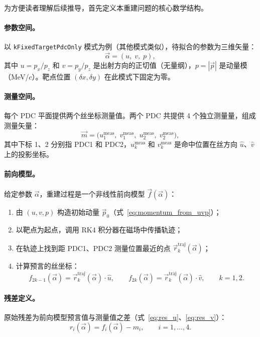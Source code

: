 \documentclass[a4paper, 11pt]{article}
\begin{document}
为方便读者理解后续推导，首先定义本重建问题的核心数学结构。

\paragraph{参数空间。}
以 \texttt{kFixedTargetPdcOnly} 模式为例（其他模式类似），待拟合的参数为三维矢量：
\begin{equation}
  \vec{\alpha} = (u,\; v,\; p),
  \label{eq:param_vec}
\end{equation}
其中 $u = p_x/p_z$ 和 $v = p_y/p_z$ 是出射方向的正切值（无量纲），$p = |\vec{p}|$ 是动量模（MeV/$c$）。靶点位置 $(\delta x, \delta y)$ 在此模式下固定为零。

\paragraph{测量空间。}
每个 PDC 平面提供两个丝坐标测量值。两个 PDC 共提供 4 个独立测量量，组成测量矢量：
\begin{equation}
  \vec{m} = \bigl(u_1^\mathrm{meas},\; v_1^\mathrm{meas},\; u_2^\mathrm{meas},\; v_2^\mathrm{meas}\bigr),
  \label{eq:meas_vec}
\end{equation}
其中下标 1、2 分别指 PDC1 和 PDC2，$u_k^\mathrm{meas}$ 和 $v_k^\mathrm{meas}$ 是命中位置在丝方向 $\hat{u}$、$\hat{v}$ 上的投影坐标。

\paragraph{前向模型。}
给定参数 $\vec{\alpha}$，重建过程是一个非线性前向模型 $\vec{f}(\vec{\alpha})$：
\begin{enumerate}[nosep]
  \item 由 $(u, v, p)$ 构造初始动量 $\vec{p}_0$（式~\eqref{eq:momentum_from_uvp}）；
  \item 以靶点为起点，调用 RK4 积分器在磁场中传播轨迹；
  \item 在轨迹上找到距 PDC1、PDC2 测量位置最近的点 $\vec{r}_k^\mathrm{traj}(\vec{\alpha})$；
  \item 计算预言的丝坐标：
  \begin{equation}
    f_{2k-1}(\vec{\alpha}) = \vec{r}_k^\mathrm{traj}(\vec{\alpha}) \cdot \hat{u}, \qquad
    f_{2k}(\vec{\alpha}) = \vec{r}_k^\mathrm{traj}(\vec{\alpha}) \cdot \hat{v}, \qquad k=1,2.
  \end{equation}
\end{enumerate}

\paragraph{残差定义。}
原始残差为前向模型预言值与测量值之差（式~\eqref{eq:res_u}、\eqref{eq:res_v}）：
\begin{equation}
  r_i(\vec{\alpha}) = f_i(\vec{\alpha}) - m_i, \qquad i = 1, \dots, 4.
\end{equation}
\end{document}
